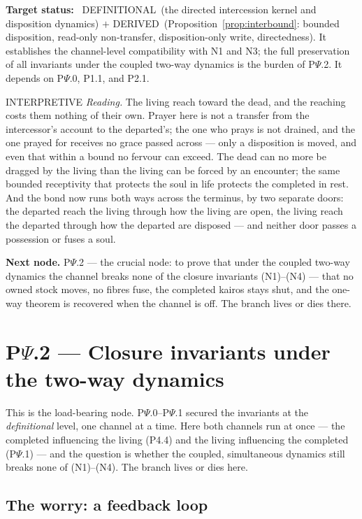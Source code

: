 \documentclass[11pt,a4paper]{article}
\newcommand{\stDerived}{\textcolor{cDer}{\textsf{\small DERIVED}}}
\newcommand{\stDef}{\textcolor{cDef}{\textsf{\small DEFINITIONAL}}}
\newcommand{\stInterp}{\textcolor{cInt}{\textsf{\small INTERPRETIVE}}}
\theoremstyle{definition}
\theoremstyle{plain}
\theoremstyle{remark}
\begin{document}
\textbf{Target status:}~
\stDef\ (the directed intercession kernel and disposition dynamics) \(+\) \stDerived\
(Proposition~\ref{prop:interbound}: bounded disposition, read-only non-transfer,
disposition-only write, directedness). It establishes the channel-level compatibility with N1
and N3; the full preservation of all invariants under the coupled two-way dynamics is the
burden of P$\Psi$.2. It depends on P$\Psi$.0, P1.1, and P2.1.

\medskip
\stInterp\quad
\emph{Reading.}
The living reach toward the dead, and the reaching costs them nothing of their own. Prayer
here is not a transfer from the intercessor's account to the departed's; the one who prays is
not drained, and the one prayed for receives no grace passed across --- only a disposition is
moved, and even that within a bound no fervour can exceed. The dead can no more be dragged by
the living than the living can be forced by an encounter; the same bounded receptivity that
protects the soul in life protects the completed in rest. And the bond now runs both ways
across the terminus, by two separate doors: the departed reach the living through how the
living are open, the living reach the departed through how the departed are disposed --- and
neither door passes a possession or fuses a soul.

\medskip
\textbf{Next node.} P$\Psi$.2 --- the crucial node: to prove that under the coupled two-way
dynamics the channel breaks none of the closure invariants (N1)--(N4) --- that no owned stock
moves, no fibres fuse, the completed kairos stays shut, and the one-way theorem is recovered
when the channel is off. The branch lives or dies there.

\section{P$\Psi$.2 --- Closure invariants under the two-way dynamics}

This is the load-bearing node. P$\Psi$.0--P$\Psi$.1 secured the invariants at the
\emph{definitional} level, one channel at a time. Here both channels run at once --- the
completed influencing the living (P4.4) and the living influencing the completed (P$\Psi$.1) ---
and the question is whether the coupled, simultaneous dynamics still breaks none of (N1)--(N4).
The branch lives or dies here.

\subsection{The worry: a feedback loop}
\end{document}
